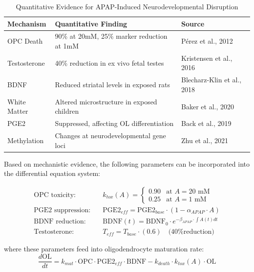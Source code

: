 \documentclass[11pt]{article}
\begin{document}
\begin{table}[h]
\centering
\caption{Quantitative Evidence for APAP-Induced Neurodevelopmental Disruption}
\begin{tabular}{|l|l|l|}
\hline
\textbf{Mechanism} & \textbf{Quantitative Finding} & \textbf{Source} \\
\hline
OPC Death & 90\% at 20mM, 25\% marker reduction at 1mM & Pérez et al., 2012 \\
Testosterone & 40\% reduction in ex vivo fetal testes & Kristensen et al., 2016 \\
BDNF & Reduced striatal levels in exposed rats & Blecharz-Klin et al., 2018 \\
White Matter & Altered microstructure in exposed children & Baker et al., 2020 \\
PGE2 & Suppressed, affecting OL differentiation & Back et al., 2019 \\
Methylation & Changes at neurodevelopmental gene loci & Zhu et al., 2021 \\
\hline
\end{tabular}
\label{tab:quantitative_evidence}
\end{table}

Based on mechanistic evidence, the following parameters can be incorporated into the differential equation system:

\begin{align}
\text{OPC toxicity:} \quad & k_{tox}(A) = 
\begin{cases}
0.90 & \text{at } A = 20\text{ mM} \\
0.25 & \text{at } A = 1\text{ mM}
\end{cases}\\
\text{PGE2 suppression:} \quad & \text{PGE2}_{eff} = \text{PGE2}_{base} \cdot (1 - \alpha_{APAP} \cdot A) \\
\text{BDNF reduction:} \quad & \text{BDNF}(t) = \text{BDNF}_{0} \cdot e^{-\beta_{APAP} \cdot \int A(t)dt} \\
\text{Testosterone:} \quad & T_{eff} = T_{base} \cdot (0.6) \quad \text{(40\% reduction)}
\end{align}

where these parameters feed into oligodendrocyte maturation rate:
\begin{equation}
\frac{d\text{OL}}{dt} = k_{mat} \cdot \text{OPC} \cdot \text{PGE2}_{eff} \cdot \text{BDNF} - k_{death} \cdot k_{tox}(A) \cdot \text{OL}
\end{equation}
\end{document}
